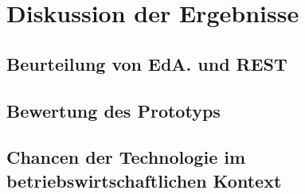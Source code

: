 \section{Diskussion der Ergebnisse}
\subsection{Beurteilung von EdA. und REST}
\subsection{Bewertung des Prototyps} 
\subsection{Chancen der Technologie im betriebswirtschaftlichen Kontext}
